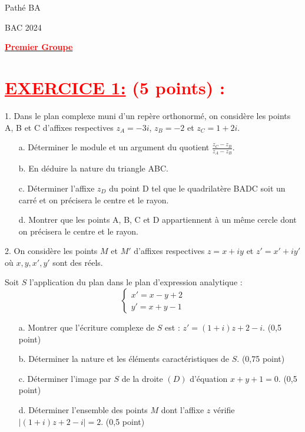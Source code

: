 \documentclass[12pt]{article}
\begin{document}
\begin{minipage}{0.8\textwidth}
	Pathé BA                          
\end{minipage}
\begin{minipage}{0.8\textwidth}
	BAC 2024
\end{minipage}

\begin{center}
\textbf{{\underline{\textcolor{red}{Premier Groupe}}}}
\end{center}
\section*{\textcolor{red}{\underline{EXERCICE 1:} (5 points) :}}

1. Dans le plan complexe muni d'un repère orthonormé, on considère les points A, B et C d'affixes respectives \(z_A = -3i\), \(z_B = -2\) et \(z_C = 1+2i\).

\begin{enumerate}
    \item[a.] Déterminer le module et un argument du quotient \(\frac{z_C - z_B}{z_A - z_B}\).
    \item[b.] En déduire la nature du triangle ABC.
    \item[c.] Déterminer l'affixe \(z_D\) du point D tel que le quadrilatère BADC soit un carré et on précisera le centre et le rayon.
    \item[d.] Montrer que les points A, B, C et D appartiennent à un même cercle dont on précisera le centre et le rayon.
\end{enumerate}

2. On considère les points \(M\) et \(M'\) d'affixes respectives \(z = x + iy\) et \(z' = x' + iy'\) où \(x, y, x', y'\) sont des réels.

Soit \(S\) l'application du plan dans le plan d'expression analytique :
\[
\begin{cases}
    x' = x - y + 2 \\
    y' = x + y - 1
\end{cases}
\]

\begin{enumerate}
    \item[a.] Montrer que l'écriture complexe de \(S\) est : \(z' = (1 + i)z + 2 - i\). (0,5 point)
    \item[b.] Déterminer la nature et les éléments caractéristiques de \(S\). (0,75 point)
    \item[c.] Déterminer l'image par \(S\) de la droite \((D)\) d'équation \(x + y + 1 = 0\). (0,5 point)
    \item[d.] Déterminer l'ensemble des points \(M\) dont l'affixe \(z\) vérifie \(\mid(1 + i)z + 2 - i \mid= 2\). (0,5 point)
\end{enumerate}
\end{document}
